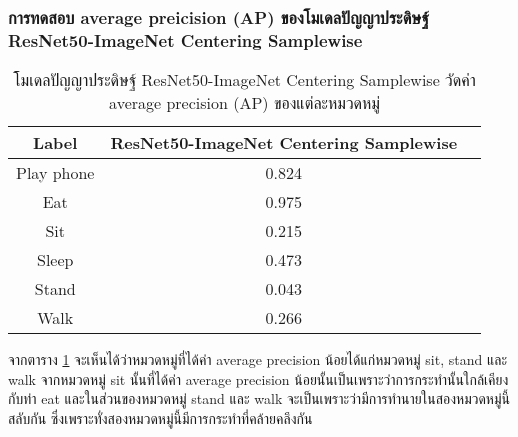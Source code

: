 \subsubsection{การทดสอบ average preicision (AP) ของโมเดลปัญญาประดิษฐ์ ResNet50-ImageNet Centering Samplewise}
\begin{table}[!ht]
	\centering
	\begin{tabular}{|c|c|c|}
			\hline
			{Label}&{ResNet50-ImageNet Centering Samplewise}			\\
			\hline
			Play phone				& 0.824			\\
			Eat						& 0.975			\\
			Sit						& 0.215			\\
			Sleep					& 0.473			\\
			Stand					& 0.043			\\
			Walk					& 0.266			\\
			\hline
	\end{tabular}
\caption{โมเดลปัญญาประดิษฐ์ ResNet50-ImageNet	 Centering Samplewise วัดค่า average precision (AP) ของแต่ละหมวดหมู่}
\label{tab: ResNet50-ImageNet Centering Samplewise average precision}
\end{table}

จากตาราง \ref{tab: ResNet50-ImageNet Centering Samplewise average precision} จะเห็นได้ว่าหมวดหมู่ที่ได้ค่า average precision น้อยได้แก่หมวดหมู่ sit, stand และ walk จากหมวดหมู่ sit นั้นที่ได้ค่า  average precision น้อยนั้นเป็นเพราะว่าการกระทำนั้นใกล้เคียงกับท่า eat และในส่วนของหมวดหมู่ stand และ walk จะเป็นเพราะว่ามีการทำนายในสองหมวดหมู่นี้สลับกัน ซึ่งเพราะทั่งสองหมวดหมู่นี้มีการกระทำที่คล้ายคลึงกัน

